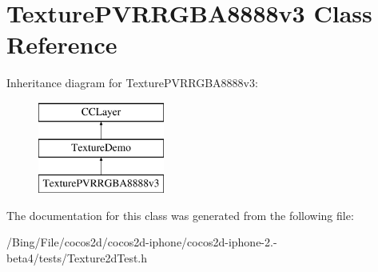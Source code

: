 \hypertarget{interface_texture_p_v_r_r_g_b_a8888v3}{\section{Texture\-P\-V\-R\-R\-G\-B\-A8888v3 Class Reference}
\label{interface_texture_p_v_r_r_g_b_a8888v3}
}
Inheritance diagram for Texture\-P\-V\-R\-R\-G\-B\-A8888v3\-:\begin{figure}[H]
\begin{center}
\leavevmode
\includegraphics[height=3.000000cm]{interface_texture_p_v_r_r_g_b_a8888v3}
\end{center}
\end{figure}


The documentation for this class was generated from the following file\-:\begin{DoxyCompactItemize}
\item 
/\-Bing/\-File/cocos2d/cocos2d-\/iphone/cocos2d-\/iphone-\/2.-\/beta4/tests/Texture2d\-Test.\-h\end{DoxyCompactItemize}
